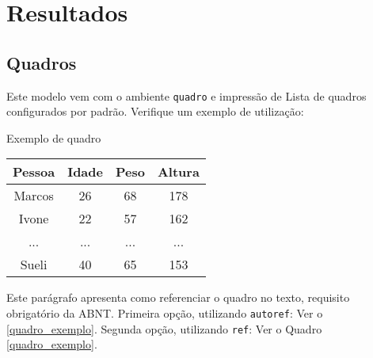 \chapter{Resultados}

\lipsum[1]

\section{Quadros}

Este modelo vem com o ambiente \texttt{quadro} e impressão de Lista de quadros 
configurados por padrão. Verifique um exemplo de utilização:

\begin{quadro}[htb]
    \caption{\label{quadro_exemplo}Exemplo de quadro}
    \begin{tabular}{|c|c|c|c|}
        \hline
        \textbf{Pessoa} & \textbf{Idade} & \textbf{Peso} & \textbf{Altura} \\ \hline
        Marcos & 26    & 68   & 178    \\ \hline
        Ivone  & 22    & 57   & 162    \\ \hline
        ...    & ...   & ...  & ...    \\ \hline
        Sueli  & 40    & 65   & 153    \\ \hline
    \end{tabular}
\end{quadro}

Este parágrafo apresenta como referenciar o quadro no texto, requisito
obrigatório da ABNT. 
Primeira opção, utilizando \texttt{autoref}: Ver o \autoref{quadro_exemplo}. 
Segunda opção, utilizando  \texttt{ref}: Ver o Quadro \ref{quadro_exemplo}.

